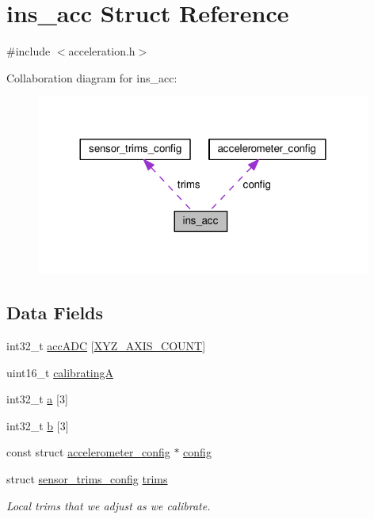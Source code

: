 \hypertarget{structins__acc}{\section{ins\+\_\+acc Struct Reference}
\label{structins__acc}
}


{\ttfamily \#include $<$acceleration.\+h$>$}



Collaboration diagram for ins\+\_\+acc\+:\nopagebreak
\begin{figure}[H]
\begin{center}
\leavevmode
\includegraphics[width=312pt]{structins__acc__coll__graph}
\end{center}
\end{figure}
\subsection*{Data Fields}
\begin{DoxyCompactItemize}
\item 
int32\+\_\+t \hyperlink{structins__acc_abe08deea0be0561c009fdeeae5e48792}{acc\+A\+D\+C} \mbox{[}\hyperlink{axis_8h_a93ac071aee723ba4580dfc8b72ae847f}{X\+Y\+Z\+\_\+\+A\+X\+I\+S\+\_\+\+C\+O\+U\+N\+T}\mbox{]}
\item 
uint16\+\_\+t \hyperlink{structins__acc_a08e8e02c8730fe3bcbaddf0b02c89b05}{calibrating\+A}
\item 
int32\+\_\+t \hyperlink{structins__acc_aea2f201870898630cf84504bd7968484}{a} \mbox{[}3\mbox{]}
\item 
int32\+\_\+t \hyperlink{structins__acc_ad193512d9a1454c203e1775145faa3c5}{b} \mbox{[}3\mbox{]}
\item 
const struct \hyperlink{structaccelerometer__config}{accelerometer\+\_\+config} $\ast$ \hyperlink{structins__acc_a36f859ac11d25f59bbbb944df442909b}{config}
\item 
struct \hyperlink{structsensor__trims__config}{sensor\+\_\+trims\+\_\+config} \hyperlink{structins__acc_af55c9038d64349f4800cc859a171f234}{trims}
\begin{DoxyCompactList}\small\item\em Local trims that we adjust as we calibrate. \end{DoxyCompactList}\end{DoxyCompactItemize}



